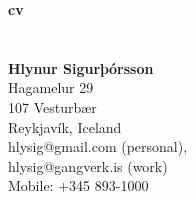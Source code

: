 \documentclass[margin]{res}
\begin{document}
\begin{figure}
    \hspace{-3.4cm}
	\begin{minipage}[b]{0.70\linewidth}
		{\Huge\bf cv\\\\\\
			\large\bf Hlynur Sigurþórsson}\\
		Hagamelur 29\\
		107 Vesturbær\\
        Reykjavík, Iceland\\
        hlysig@gmail.com (personal),\\hlysig@gangverk.is (work)\\
		Mobile: +345 893-1000\\
	\end{minipage}
\end{figure}
\begin{resume}
    
    
	
	
	
	
	
\end{resume}
\end{document}

